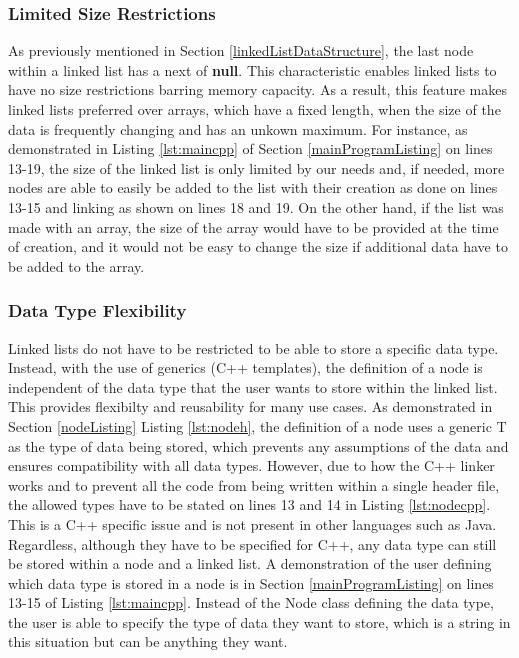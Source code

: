 \documentclass[letterpaper, 10pt,DIV=13]{scrartcl}
\numberwithin{equation}{section} %
\numberwithin{figure}{section} %
\numberwithin{table}{section} %
\begin{document}
\subsubsection{Limited Size Restrictions}
As previously mentioned in Section \ref{linkedListDataStructure}, the last node within a linked list has a next of \textbf{null}. This characteristic enables linked lists to have no size restrictions barring memory capacity. As a result, this feature makes linked lists preferred over arrays, which have a fixed length, when the size of the data is frequently changing and has an unkown maximum. For instance, as demonstrated in Listing \ref{lst:maincpp} of Section \ref{mainProgramListing} on lines 13-19, the size of the linked list is only limited by our needs and, if needed, more nodes are able to easily be added to the list with their creation as done on lines 13-15 and linking as shown on lines 18 and 19. On the other hand, if the list was made with an array, the size of the array would have to be provided at the time of creation, and it would not be easy to change the size if additional data have to be added to the array.

\subsubsection{Data Type Flexibility}\label{linkedListDataType}
Linked lists do not have to be restricted to be able to store a specific data type. Instead, with the use of generics (C++ templates), the definition of a node is independent of the data type that the user wants to store within the linked list. This provides flexibilty and reusability for many use cases. As demonstrated in Section \ref{nodeListing} Listing \ref{lst:nodeh}, the definition of a node uses a generic T as the type of data being stored, which prevents any assumptions of the data and ensures compatibility with all data types. However, due to how the C++ linker works and to prevent all the code from being written within a single header file, the allowed types have to be stated on lines 13 and 14 in Listing \ref{lst:nodecpp}. This is a C++ specific issue and is not present in other languages such as Java. Regardless, although they have to be specified for C++, any data type can still be stored within a node and a linked list. A demonstration of the user defining which data type is stored in a node is in Section \ref{mainProgramListing} on lines 13-15 of Listing \ref{lst:maincpp}. Instead of the Node class defining the data type, the user is able to specify the type of data they want to store, which is a string in this situation but can be anything they want.
\end{document}
